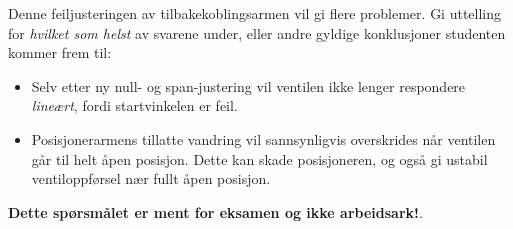 \vskip 10pt

Denne feiljusteringen av tilbakekoblingsarmen vil gi flere problemer. Gi uttelling for {\it hvilket som helst} av svarene under, eller andre gyldige konklusjoner studenten kommer frem til:

\begin{itemize}
\item{} Selv etter ny null- og span-justering vil ventilen ikke lenger respondere {\it lineært}, fordi startvinkelen er feil.
\item{} Posisjonerarmens tillatte vandring vil sannsynligvis overskrides når ventilen går til helt åpen posisjon. Dette kan skade posisjoneren, og også gi ustabil ventiloppførsel nær fullt åpen posisjon.
\end{itemize}








{\bf Dette spørsmålet er ment for eksamen og ikke arbeidsark!}.


